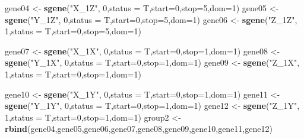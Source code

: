\documentclass[]{article}
\newenvironment{Shaded}{\begin{snugshade}}{\end{snugshade}}
\newcommand{\DataTypeTok}[1]{\textcolor[rgb]{0.13,0.29,0.53}{#1}}
\newcommand{\DecValTok}[1]{\textcolor[rgb]{0.00,0.00,0.81}{#1}}
\newcommand{\KeywordTok}[1]{\textcolor[rgb]{0.13,0.29,0.53}{\textbf{#1}}}
\newcommand{\NormalTok}[1]{#1}
\newcommand{\StringTok}[1]{\textcolor[rgb]{0.31,0.60,0.02}{#1}}
\begin{document}
\begin{Shaded}
\begin{Highlighting}[]
\NormalTok{gene04 <-}\StringTok{ }\KeywordTok{sgene}\NormalTok{(}\StringTok{"X_1Z"}\NormalTok{,          }\DecValTok{0}\NormalTok{,}\DataTypeTok{status =}\NormalTok{ T,}\DataTypeTok{start=}\DecValTok{0}\NormalTok{,}\DataTypeTok{stop=}\DecValTok{5}\NormalTok{,}\DataTypeTok{dom=}\DecValTok{1}\NormalTok{)}
\NormalTok{gene05 <-}\StringTok{ }\KeywordTok{sgene}\NormalTok{(}\StringTok{"Y_1Z"}\NormalTok{,          }\DecValTok{0}\NormalTok{,}\DataTypeTok{status =}\NormalTok{ T,}\DataTypeTok{start=}\DecValTok{0}\NormalTok{,}\DataTypeTok{stop=}\DecValTok{5}\NormalTok{,}\DataTypeTok{dom=}\DecValTok{1}\NormalTok{)}
\NormalTok{gene06 <-}\StringTok{ }\KeywordTok{sgene}\NormalTok{(}\StringTok{"Z_1Z"}\NormalTok{,          }\DecValTok{1}\NormalTok{,}\DataTypeTok{status =}\NormalTok{ T,}\DataTypeTok{start=}\DecValTok{0}\NormalTok{,}\DataTypeTok{stop=}\DecValTok{5}\NormalTok{,}\DataTypeTok{dom=}\DecValTok{1}\NormalTok{)}

\NormalTok{gene07 <-}\StringTok{ }\KeywordTok{sgene}\NormalTok{(}\StringTok{"X_1X"}\NormalTok{,          }\DecValTok{0}\NormalTok{,}\DataTypeTok{status =}\NormalTok{ T,}\DataTypeTok{start=}\DecValTok{0}\NormalTok{,}\DataTypeTok{stop=}\DecValTok{1}\NormalTok{,}\DataTypeTok{dom=}\DecValTok{1}\NormalTok{)}
\NormalTok{gene08 <-}\StringTok{ }\KeywordTok{sgene}\NormalTok{(}\StringTok{"Y_1X"}\NormalTok{,          }\DecValTok{0}\NormalTok{,}\DataTypeTok{status =}\NormalTok{ T,}\DataTypeTok{start=}\DecValTok{0}\NormalTok{,}\DataTypeTok{stop=}\DecValTok{1}\NormalTok{,}\DataTypeTok{dom=}\DecValTok{1}\NormalTok{)}
\NormalTok{gene09 <-}\StringTok{ }\KeywordTok{sgene}\NormalTok{(}\StringTok{"Z_1X"}\NormalTok{,          }\DecValTok{1}\NormalTok{,}\DataTypeTok{status =}\NormalTok{ T,}\DataTypeTok{start=}\DecValTok{0}\NormalTok{,}\DataTypeTok{stop=}\DecValTok{1}\NormalTok{,}\DataTypeTok{dom=}\DecValTok{1}\NormalTok{)}

\NormalTok{gene10 <-}\StringTok{ }\KeywordTok{sgene}\NormalTok{(}\StringTok{"X_1Y"}\NormalTok{,          }\DecValTok{0}\NormalTok{,}\DataTypeTok{status =}\NormalTok{ T,}\DataTypeTok{start=}\DecValTok{0}\NormalTok{,}\DataTypeTok{stop=}\DecValTok{1}\NormalTok{,}\DataTypeTok{dom=}\DecValTok{1}\NormalTok{)}
\NormalTok{gene11 <-}\StringTok{ }\KeywordTok{sgene}\NormalTok{(}\StringTok{"Y_1Y"}\NormalTok{,          }\DecValTok{0}\NormalTok{,}\DataTypeTok{status =}\NormalTok{ T,}\DataTypeTok{start=}\DecValTok{0}\NormalTok{,}\DataTypeTok{stop=}\DecValTok{1}\NormalTok{,}\DataTypeTok{dom=}\DecValTok{1}\NormalTok{)}
\NormalTok{gene12 <-}\StringTok{ }\KeywordTok{sgene}\NormalTok{(}\StringTok{"Z_1Y"}\NormalTok{,          }\DecValTok{1}\NormalTok{,}\DataTypeTok{status =}\NormalTok{ T,}\DataTypeTok{start=}\DecValTok{0}\NormalTok{,}\DataTypeTok{stop=}\DecValTok{1}\NormalTok{,}\DataTypeTok{dom=}\DecValTok{1}\NormalTok{)}
\NormalTok{group2 <-}\StringTok{ }\KeywordTok{rbind}\NormalTok{(gene04,gene05,gene06,gene07,gene08,gene09,gene10,gene11,gene12)}
\end{Highlighting}
\end{Shaded}
\end{document}
